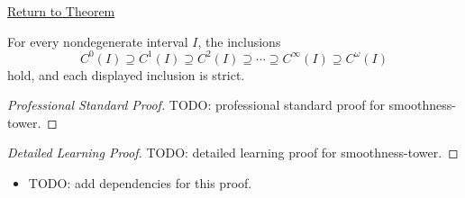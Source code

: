 \newpage
{}
\label{prf:smoothness-tower}

\begin{remark*}[Return]
\hyperref[thm:smoothness-tower]{Return to Theorem}
\end{remark*}

\begin{theorem*}
For every nondegenerate interval \(I\), the inclusions
\[
  C^0(I)\supseteq C^1(I)\supseteq C^2(I)\supseteq \cdots
  \supseteq C^\infty(I)\supseteq C^\omega(I)
\]
hold, and each displayed inclusion is strict.
\end{theorem*}

\begin{proof}[Professional Standard Proof]
\LRAProofBodyStart
TODO: professional standard proof for smoothness-tower.
\end{proof}

\begin{proof}[Detailed Learning Proof]
\LRAProofBodyStart
TODO: detailed learning proof for smoothness-tower.
\end{proof}

\begin{remark*}
\end{remark*}

\begin{dependencies}
\begin{itemize}
  \item TODO: add dependencies for this proof.
\end{itemize}
\end{dependencies}

\clearpage
